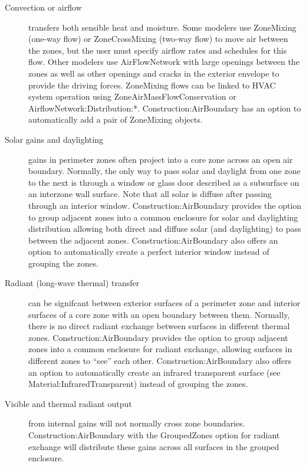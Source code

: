 \begin{description}
  \item[Convection or airflow] transfers both sensible heat and moisture. Some modelers use ZoneMixing (one-way flow) or ZoneCrossMixing (two-way flow) to move air between the zones, but the user must specify airflow rates and schedules for this flow. Other modelers use AirFlowNetwork with large openings between the zones as well as other openings and cracks in the exterior envelope to provide the driving forces. ZoneMixing flows can be linked to HVAC system operation using ZoneAirMassFlowConservation or AirflowNetwork:Distribution:*. Construction:AirBoundary has an option to automatically add a pair of ZoneMixing objects.

  \item[Solar gains and daylighting] gains in perimeter zones often project into a core zone across an open air boundary. Normally, the only way to pass solar and daylight from one zone to the next is through a window or glass door described as a subsurface on an interzone wall surface. Note that all solar is diffuse after passing through an interior window. Construction:AirBoundary provides the option to group adjacent zones into a common enclosure for solar and daylighting distribution allowing both direct and diffuse solar (and daylighting) to pass between the adjacent zones. Construction:AirBoundary also offers an option to automatically create a perfect interior window instead of grouping the zones.

  \item[Radiant (long-wave thermal) transfer] can be signifcant between exterior surfaces of a perimeter zone and interior surfaces of a core zone with an open boundary between them. Normally, there is no direct radiant exchange between surfaces in different thermal zones. Construction:AirBoundary provides the option to group adjacent zones into a common enclosure for radiant exchange, allowing surfaces in different zones to ``see'' each other. Construction:AirBoundary also offers an option to automatically create an infrared transparent surface (see Material:InfraredTransparent) instead of grouping the zones.

  \item[Visible and thermal radiant output] from internal gains will not normally cross zone boundaries. Construction:AirBoundary with the GroupedZones option for radiant exchange will distribute these gains across all surfaces in the grouped enclosure.
\end{description}

